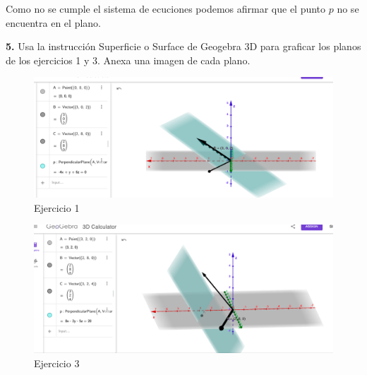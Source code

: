 \documentclass{article}
\begin{document}
Como no se cumple el sistema de ecuciones podemos afirmar que el punto $p$ no se encuentra en el plano.
\vspace{10pt}

\textbf{5.} Usa la instrucción Superficie o Surface de Geogebra 3D para graficar los planos de los ejercicios 1 y 3. Anexa una imagen de cada plano.
\vspace{10pt}

\begin{figure}
    \centering
    \includegraphics*[width=15cm]{Ejercicio1.png}
    \caption{Ejercicio 1}
\end{figure}

\begin{figure}
    \centering
    \includegraphics*[width=15cm]{Ejercicio3.png}
    \caption{Ejercicio 3}
\end{figure}
\end{document}
